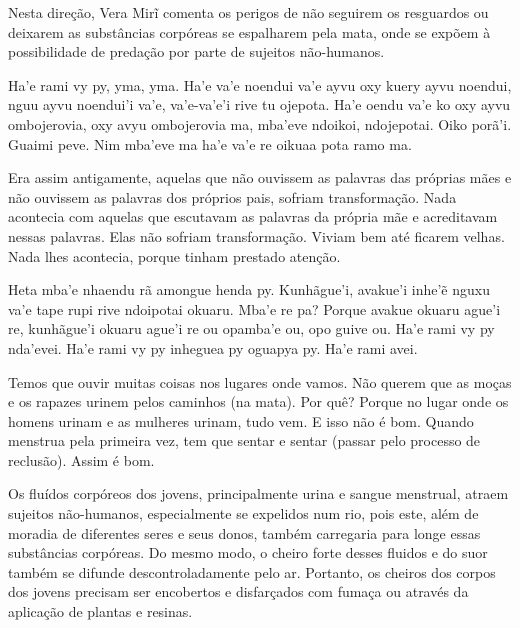 Nesta direção, Vera Mirĩ comenta os perigos de não seguirem os
resguardos ou deixarem as substâncias corpóreas se espalharem pela
mata, onde se expõem à possibilidade de predação por parte de sujeitos
não-humanos. 

\bigskip

\begin{paracol}{2}
\footnotesize
Ha’e rami vy py, yma, yma. Ha’e va’e noendui va’e ayvu oxy kuery ayvu
noendui, nguu ayvu noendui’i va’e, va’e-va’e’i rive tu ojepota. Ha’e
oendu va’e ko oxy ayvu ombojerovia, oxy avyu ombojerovia ma, mba’eve
ndoikoi, ndojepotai. Oiko porã’i. Guaimi peve. Nim mba’eve ma ha’e va’e
re oikuaa pota ramo ma. 

\switchcolumn
Era assim antigamente, aquelas que não ouvissem as palavras das próprias
mães e não ouvissem as palavras dos próprios pais, sofriam
transformação. Nada acontecia com aquelas que escutavam as palavras da
própria mãe e acreditavam nessas palavras. Elas não sofriam
transformação. Viviam bem até ficarem velhas. Nada lhes acontecia,
porque tinham prestado atenção. 

\switchcolumn
Heta mba'e nhaendu rã amongue henda py. Kunhãgue'i, avakue'i inhe'ẽ
nguxu va'e tape rupi rive ndoipotai okuaru. Mba'e re pa? Porque avakue
okuaru ague'i re, kunhãgue'i okuaru ague'i re ou opamba'e ou, opo guive
ou. Ha'e rami vy py nda'evei. Ha'e rami vy py inheguea py oguapya py.
Ha'e rami avei.

\switchcolumn
Temos que ouvir muitas coisas nos lugares onde vamos. Não querem que as
moças e os rapazes urinem pelos caminhos (na mata). Por quê? Porque no
lugar onde os homens urinam e as mulheres urinam, tudo
vem\footnotemark{}. E isso não é bom. Quando menstrua pela primeira
vez, tem que sentar e sentar (passar pelo processo de reclusão). Assim
é bom.
\end{paracol}

\bigskip

Os fluídos corpóreos dos jovens, principalmente urina e sangue
menstrual, atraem sujeitos não-humanos, especialmente se expelidos num
rio, pois este, além de moradia de diferentes seres e seus donos,
também carregaria para longe essas substâncias corpóreas. Do mesmo
modo, o cheiro forte desses fluidos e do suor também se difunde
descontroladamente pelo ar. Portanto, os cheiros dos corpos dos jovens
precisam ser encobertos e disfarçados com fumaça ou através da
aplicação de plantas e resinas. 

